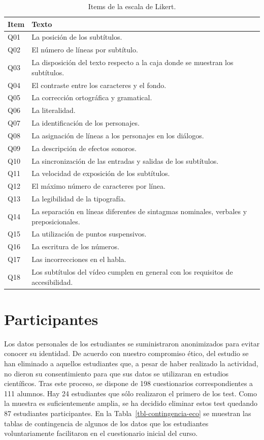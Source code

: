 \documentclass[
  12pt,
  a4paper,
  extrafontsizes,
  onecolumn,
  openright]{memoir}
\begin{document}
\hypertarget{tbl-likert-scale}{}
\begin{longtable}{ll}
\caption{\label{tbl-likert-scale}Items de la escala de Likert. }\tabularnewline

\toprule
Item & Texto \\ 
\midrule
Q01 & La posición de los subtítulos. \\ 
Q02 & El número de líneas por subtítulo. \\ 
Q03 & La disposición del texto respecto a la caja donde se muestran los subtítulos. \\ 
Q04 & El contraste entre los caracteres y el fondo. \\ 
Q05 & La corrección ortográfica y gramatical. \\ 
Q06 & La literalidad. \\ 
Q07 & La identificación de los personajes. \\ 
Q08 & La asignación de líneas a los personajes en los diálogos. \\ 
Q09 & La descripción de efectos sonoros. \\ 
Q10 & La sincronización de las entradas y salidas de los subtítulos. \\ 
Q11 & La velocidad de exposición de los subtítulos. \\ 
Q12 & El máximo número de caracteres por línea. \\ 
Q13 & La legibilidad de la tipografía. \\ 
Q14 & La separación en líneas diferentes de sintagmas nominales, verbales y preposicionales. \\ 
Q15 & La utilización de puntos suspensivos. \\ 
Q16 & La escritura de los números. \\ 
Q17 & Las incorrecciones en el habla. \\ 
Q18 & Los subtítulos del vídeo cumplen en general con los requisitos de accesibilidad. \\ 
\bottomrule
\end{longtable}

\hypertarget{participantes}{%
\section{Participantes}\label{participantes}}

Los datos personales de los estudiantes se suministraron anonimizados
para evitar conocer su identidad. De acuerdo con nuestro compromiso
ético, del estudio se han eliminado a aquellos estudiantes que, a pesar
de haber realizado la actividad, no dieron su consentimiento para que
sus datos se utilizaran en estudios científicos. Tras este proceso, se
dispone de 198 cuestionarios correspondientes a 111 alumnos. Hay 24
estudiantes que sólo realizaron el primero de los test. Como la muestra
es suficientemente amplia, se ha decidido eliminar estos test quedando
87 estudiantes participantes. En la Tabla~\ref{tbl-contingencia-eco} se
muestran las tablas de contingencia de algunos de los datos que los
estudiantes voluntariamente facilitaron en el cuestionario inicial del
curso.
\end{document}
